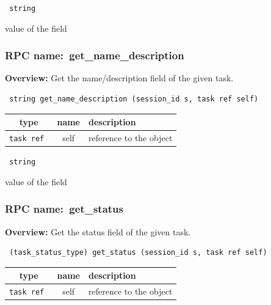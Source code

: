 {\tt 
string
}


value of the field
\vspace{0.3cm}
\vspace{0.3cm}
\vspace{0.3cm}
\subsubsection{RPC name:~get\_name\_description}

{\bf Overview:} 
Get the name/description field of the given task.

\begin{verbatim} string get_name_description (session_id s, task ref self)\end{verbatim}



 
\vspace{0.3cm}
\begin{tabular}{|c|c|p{7cm}|}
 \hline
{\bf type} & {\bf name} & {\bf description} \\ \hline
{\tt task ref } & self & reference to the object \\ \hline 

\end{tabular}

\vspace{0.3cm}

{\tt 
string
}


value of the field
\vspace{0.3cm}
\vspace{0.3cm}
\vspace{0.3cm}
\subsubsection{RPC name:~get\_status}

{\bf Overview:} 
Get the status field of the given task.

\begin{verbatim} (task_status_type) get_status (session_id s, task ref self)\end{verbatim}



 
\vspace{0.3cm}
\begin{tabular}{|c|c|p{7cm}|}
 \hline
{\bf type} & {\bf name} & {\bf description} \\ \hline
{\tt task ref } & self & reference to the object \\ \hline 

\end{tabular}

